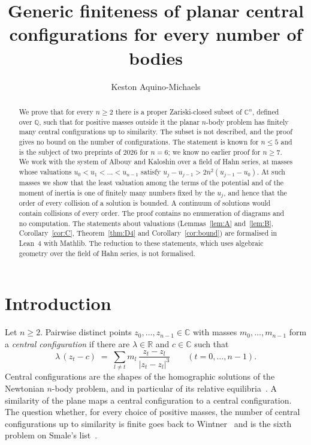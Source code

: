 \documentclass[11pt]{amsart}
\theoremstyle{definition}
\theoremstyle{remark}
\numberwithin{equation}{section}
\newcommand{\QQ}{\mathbb{Q}}
\newcommand{\CC}{\mathbb{C}}
\newcommand{\RR}{\mathbb{R}}
\begin{document}
\title[Generic finiteness of planar central configurations]{Generic finiteness of planar central configurations for every number of bodies}

\author{Keston Aquino-Michaels}
\address{Independent researcher}

\begin{abstract}
We prove that for every $n \ge 2$ there is a proper Zariski-closed subset of $\CC^n$, defined over
$\QQ$, such that for positive masses outside it the planar $n$-body problem has finitely many central
configurations up to similarity. The subset is not described, and the proof gives no bound on the number
of configurations. The statement is known for $n \le 5$ and is the subject of two preprints of 2026 for
$n = 6$; we know no earlier proof for $n \ge 7$. We work with the system of Albouy and Kaloshin over a
field of Hahn series, at masses whose valuations $u_0 < u_1 < \dots < u_{n-1}$ satisfy
$u_j - u_{j-1} > 2n^2 (u_{j-1} - u_0)$. At such masses we show that the least valuation among the terms
of the potential and of the moment of inertia is one of finitely many numbers fixed by the $u_j$, and
hence that the order of every collision of a solution is bounded. A continuum of solutions would
contain collisions of every order. The proof contains no enumeration of diagrams and no computation.
The statements about valuations (Lemmas~\ref{lem:A} and~\ref{lem:B}, Corollary~\ref{cor:C},
Theorem~\ref{thm:D4} and Corollary~\ref{cor:bound}) are formalised in Lean~4 with Mathlib. The
reduction to these statements, which uses algebraic geometry over the field of Hahn series, is not
formalised.
\end{abstract}

\maketitle

\section{Introduction}\label{sec:intro}

Let $n \ge 2$. Pairwise distinct points $z_0, \dots, z_{n-1} \in \CC$ with masses $m_0, \dots, m_{n-1}$
form a \emph{central configuration} if there are $\lambda \in \RR$ and $c \in \CC$ such that
\begin{equation}\label{eq:cc}
  \lambda\,(z_t - c) \;=\; \sum_{l \ne t} m_l\, \frac{z_t - z_l}{|z_t - z_l|^{3}}
  \qquad (t = 0, \dots, n-1).
\end{equation}
Central configurations are the shapes of the homographic solutions of the Newtonian $n$-body problem,
and in particular of its relative equilibria~\cite{wintner1941}. A similarity of the plane maps a central
configuration to a central configuration. The question whether, for every choice of positive masses, the
number of central configurations up to similarity is finite goes back to Wintner~\cite{wintner1941} and
is the sixth problem on Smale's list~\cite{smale1998}.
\end{document}
